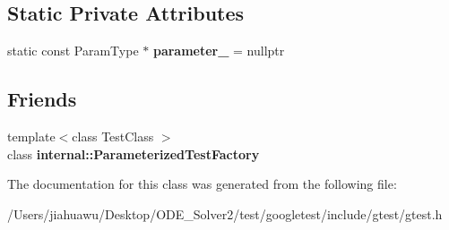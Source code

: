 \subsection*{Static Private Attributes}
\begin{DoxyCompactItemize}
\item 
\mbox{\label{classtesting_1_1_with_param_interface_ad809d968c4285b535c5c74718d40ccf0}} 
static const Param\+Type $\ast$ {\bfseries parameter\+\_\+} = nullptr
\end{DoxyCompactItemize}
\subsection*{Friends}
\begin{DoxyCompactItemize}
\item 
\mbox{\label{classtesting_1_1_with_param_interface_a7543eb7df89f00fff517dba24bc11dd5}} 
{\footnotesize template$<$class Test\+Class $>$ }\\class {\bfseries internal\+::\+Parameterized\+Test\+Factory}
\end{DoxyCompactItemize}


The documentation for this class was generated from the following file\+:\begin{DoxyCompactItemize}
\item 
/\+Users/jiahuawu/\+Desktop/\+O\+D\+E\+\_\+\+Solver2/test/googletest/include/gtest/gtest.\+h\end{DoxyCompactItemize}
